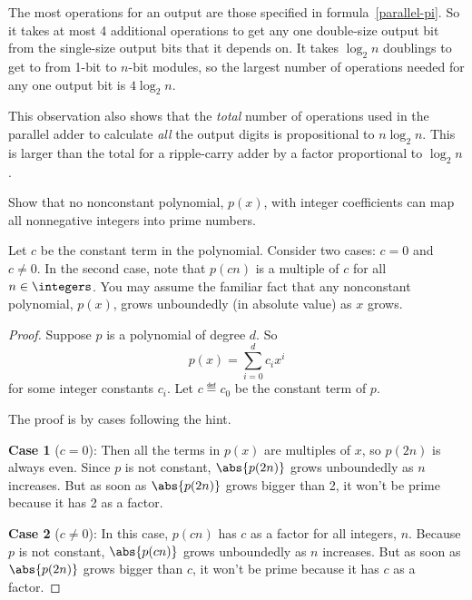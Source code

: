 \documentclass[handout]{mcs}
\begin{document}
\begin{problem}
\begin{solution}
 The most operations for an output are those specified in
  formula~\eqref{parallel-pi}.  So it takes at most 4 additional
  operations to get any one double-size output bit from the single-size
  output bits that it depends on.  It takes $\log_2 n$ doublings to get to
  from 1-bit to $n$-bit modules, so the largest number of operations
  needed for any one output bit is $4 \log_2 n$.

This observation also shows that the \emph{total} number of operations
used in the parallel adder to calculate \emph{all} the output digits is
propositional to $ n \log_2 n$.  This is larger than the total for a
ripple-carry adder by a factor proportional to $\log_2 n$.
\end{solution}

\eparts

\end{problem}

\begin{problem}
  Show that no nonconstant polynomial, $p(x)$, with integer coefficients
  can map all nonnegative integers into prime numbers.

  \hint Let $c$ be the constant term in the polynomial.  Consider two
  cases: $c=0$ and $c \neq 0$.  In the second case, note that $p(cn)$ is a
  multiple of $c$ for all $n \in \integers$.  You may assume the familiar
  fact that any nonconstant polynomial, $p(x)$, grows unboundedly (in
  absolute value) as $x$ grows.
 
\begin{solution}
\begin{proof}
Suppose $p$ is a polynomial of degree $d$. So
\[
p(x) = \sum_{i=0}^d c_ix^i
\]
for some integer constants $c_i$.  Let $c \eqdef c_0$ be the constant term
of $p$.

The proof is by cases following the hint.  

\textbf{Case 1} ($c = 0$): Then all the terms in $p(x)$ are multiples of
$x$, so $p(2n)$ is always even.  Since $p$ is not constant, $\abs{p(2n)}$
grows unboundedly as $n$ increases.  But as soon as $\abs{p(2n)}$
grows bigger than 2, it won't be prime because it has 2 as a factor.

\textbf{Case 2} ($c \neq 0$): In this case, $p(cn)$ has $c$ as a factor
for all integers, $n$.  Because $p$ is not constant, $\abs{p(cn)}$
grows unboundedly as $n$ increases.  But as soon as $\abs{p(2n)}$
grows bigger than $c$, it won't be prime because it has $c$ as a factor.
\end{proof}

\end{solution}

\end{problem}

\end{document}
